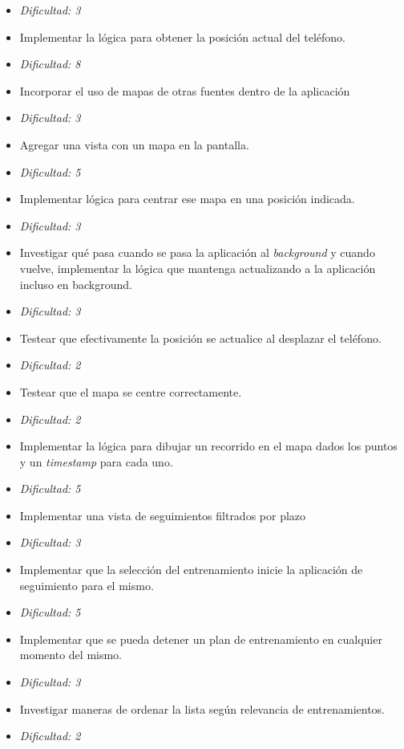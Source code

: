 \documentclass[10pt, a4paper,english,spanish]{article}
\begin{document}
\begin{itemize}
	\item[] \hfill \textit{Dificultad: 3}
	\item Implementar la lógica para obtener la posición actual del teléfono.
	\item[] \hfill \textit{Dificultad: 8}
	\item Incorporar el uso de mapas de otras fuentes dentro de la aplicación
	\item[] \hfill \textit{Dificultad: 3}
	\item Agregar una vista con un mapa en la pantalla.
	\item[] \hfill \textit{Dificultad: 5}
	\item Implementar lógica para centrar ese mapa en una posición indicada.
	\item[] \hfill \textit{Dificultad: 3}
	\item Investigar qué pasa cuando se pasa la aplicación al \textit{background} y cuando vuelve, 
			implementar la lógica que mantenga actualizando a la aplicación incluso en background.
	\item[] \hfill \textit{Dificultad: 3}
	\item Testear que efectivamente la posición se actualice al desplazar el teléfono.
	\item[] \hfill \textit{Dificultad: 2}
	\item Testear que el mapa se centre correctamente.
	\item[] \hfill \textit{Dificultad: 2}
	\item Implementar la lógica para dibujar un recorrido en el mapa dados los puntos y un \textit{timestamp} para cada uno.
	\item[] \hfill \textit{Dificultad: 5}
	\item Implementar una vista de seguimientos filtrados por plazo	
	\item[] \hfill \textit{Dificultad: 3}
	\item Implementar que la selecci\'on del entrenamiento inicie la aplicación de seguimiento para el mismo.
	\item[] \hfill \textit{Dificultad: 5}
	\item Implementar que se pueda detener un plan de entrenamiento en cualquier momento del mismo.
	\item[] \hfill \textit{Dificultad: 3}
	\item Investigar maneras de ordenar la lista según relevancia de entrenamientos.
	\item[] \hfill \textit{Dificultad: 2}
\end{itemize}
\end{document}
